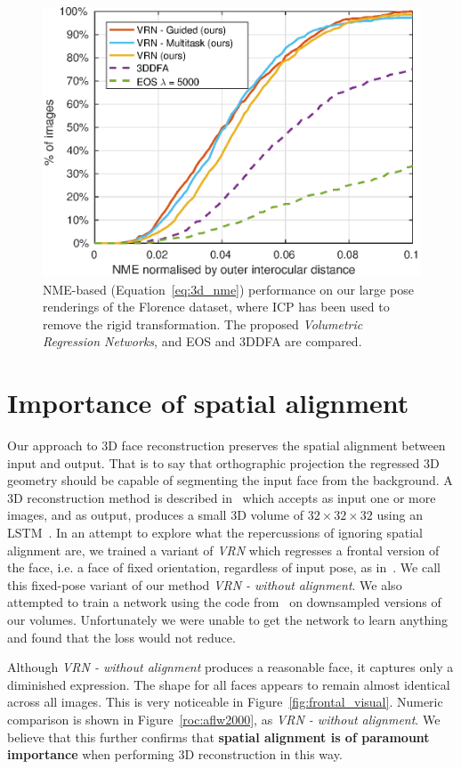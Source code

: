 \begin{figure}
  \centering
  \includegraphics[width=0.75\linewidth]{curves-icp/florence.eps}
  \caption[NME performance on Florence with ICP Alignment]{NME-based
    (Equation~\ref{eq:3d_nme}) performance on our large pose
    renderings of the Florence dataset, where ICP has been used to
    remove the rigid transformation. The proposed \textit{Volumetric
      Regression Networks}, and EOS and 3DDFA are compared.}
  \label{roc:florenceicp}
\end{figure}


\section{Importance of spatial alignment}
\label{sec:spatialimportance}

Our approach to 3D face reconstruction preserves the spatial alignment
between input and output. That is to say that orthographic projection
the regressed 3D geometry should be capable of segmenting the input
face from the background. A 3D reconstruction method is described
in~\cite{choy20163d} which accepts as input one or more images, and as
output, produces a small 3D volume of $32 \times 32 \times 32$ using
an LSTM~\cite{hochreiter1997long}. In an attempt to explore what the
repercussions of ignoring spatial alignment are, we trained a variant
of \textit{VRN} which regresses a frontal version of the face, i.e. a
face of fixed orientation, regardless of input pose, as
in~\cite{choy20163d}. We call this fixed-pose variant of our method
\textit{VRN - without alignment}. We also attempted to train a network
using the code from~\cite{choy20163d} on downsampled versions of our
volumes. Unfortunately we were unable to get the network to learn
anything and found that the loss would not reduce.

Although \textit{VRN - without alignment} produces a reasonable face,
it captures only a diminished expression. The shape for all faces
appears to remain almost identical across all images. This is very
noticeable in Figure~\ref{fig:frontal_visual}. Numeric comparison is
shown in Figure~\ref{roc:aflw2000}, as \textit{VRN - without
  alignment}. We believe that this further confirms that
\textbf{spatial alignment is of paramount importance} when performing
3D reconstruction in this way.

